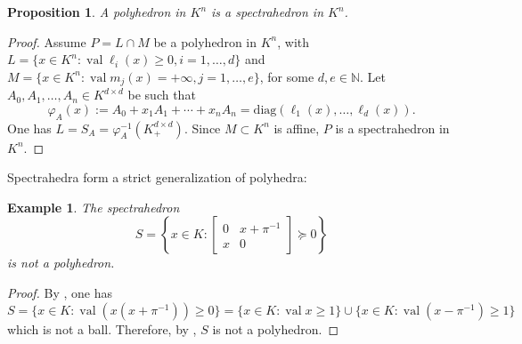 \documentclass[a4paper,oneside,11pt]{article}
\newtheorem{proposition}[theorem]{Proposition}
\newtheorem{example}[theorem]{Example}
\renewcommand{\span}[1]{{\text{span}(#1)}} %
\DeclareMathOperator{\val}{val}
\def\diag{\mathrm{diag}}
\begin{document}
\begin{proposition}
  A polyhedron in $K^n$ is a spectrahedron in $K^n$.
\end{proposition}
\begin{proof}
  Assume $P = L \cap M$ be a polyhedron in $K^n$, with
  $L = \{x \in K^n : \val \ell_i(x) \geq 0, i=1, \ldots, d\}$
  and $M = \{x \in K^n : \val m_j(x) = +\infty, j=1, \ldots, e\}$,
  for some $d, e \in \mathbb{N}$.
  Let $A_0,A_1,\ldots,A_n \in K^{d \times d}$ be such that
  $$
  \varphi_A(x) := A_0+x_1A_1+\cdots+x_nA_n = \diag(\ell_1(x), \ldots, \ell_d(x)).
  $$
  One has $L = S_A = \varphi_A^{-1}(K^{d \times d}_+)$. Since $M \subset K^n$ is affine, 
  $P$ is a spectrahedron in $K^n$.
%
\end{proof}

Spectrahedra form a strict generalization of polyhedra:

\begin{example}
  The spectrahedron
  \[
  S = \left\{x \in K : \begin{bmatrix} 0 & x + \pi^{-1} \\ x & 0 \end{bmatrix} \succeq 0\right\}
  \] 
  is not a polyhedron.
\end{example}
\begin{proof}
  By , one has $S = \{x \in K : \val(x(x + \pi^{-1})) \geq 0\} =
  \{x \in K: \val x \ge 1\} \cup \{x \in K: \val (x - \pi^{-1}) \ge 1\}$ which is not a ball.
  Therefore, by , $S$ is not a polyhedron.
\end{proof}
\end{document}
